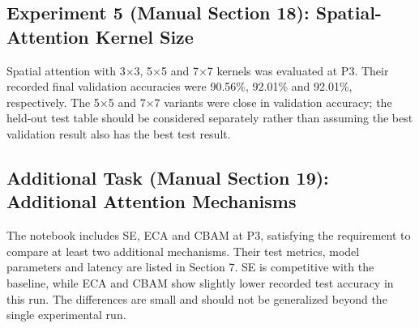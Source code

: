 \documentclass[10pt]{article}
\begin{document}
\subsection*{Experiment 5 (Manual Section 18): Spatial-Attention Kernel Size}
Spatial attention with 3$\times$3, 5$\times$5 and 7$\times$7 kernels was evaluated at P3. Their recorded final validation accuracies were 90.56\%, 92.01\% and 92.01\%, respectively. The 5$\times$5 and 7$\times$7 variants were close in validation accuracy; the held-out test table should be considered separately rather than assuming the best validation result also has the best test result.

\subsection*{Additional Task (Manual Section 19): Additional Attention Mechanisms}
The notebook includes SE, ECA and CBAM at P3, satisfying the requirement to compare at least two additional mechanisms. Their test metrics, model parameters and latency are listed in Section 7. SE is competitive with the baseline, while ECA and CBAM show slightly lower recorded test accuracy in this run. The differences are small and should not be generalized beyond the single experimental run.
\end{document}
